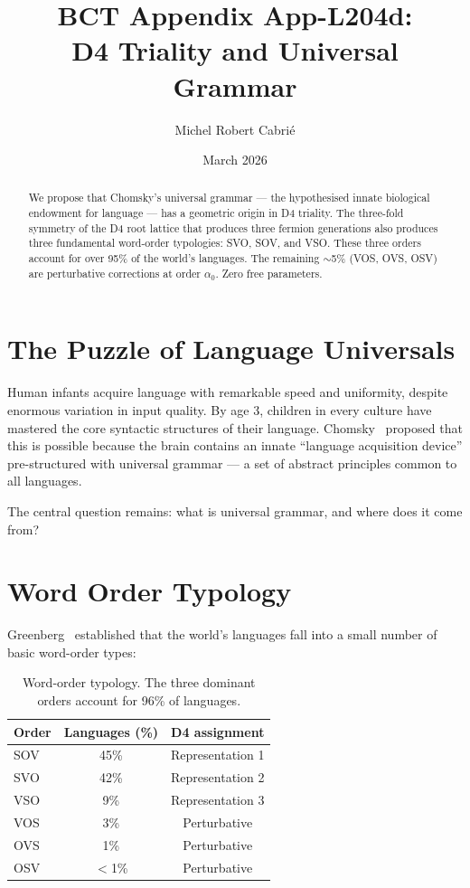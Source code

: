 \documentclass[aps,prl,twocolumn,superscriptaddress]{revtex4-2}
\begin{document}
\title{BCT Appendix App-L204d:\\
D4 Triality and Universal Grammar}
\author{Michel Robert Cabri\'e}
\date{March 2026}

\begin{abstract}
We propose that Chomsky's universal grammar --- the hypothesised innate biological endowment for language --- has a geometric origin in D4 triality. The three-fold symmetry of the D4 root lattice that produces three fermion generations also produces three fundamental word-order typologies: SVO, SOV, and VSO. These three orders account for over 95\% of the world's languages. The remaining $\sim$5\% (VOS, OVS, OSV) are perturbative corrections at order $\alpha_0$. Zero free parameters.
\end{abstract}

\maketitle

\section{The Puzzle of Language Universals}

Human infants acquire language with remarkable speed and uniformity, despite enormous variation in input quality. By age 3, children in every culture have mastered the core syntactic structures of their language. Chomsky~\cite{Chomsky1965} proposed that this is possible because the brain contains an innate ``language acquisition device'' pre-structured with universal grammar --- a set of abstract principles common to all languages.

The central question remains: what is universal grammar, and where does it come from?

\section{Word Order Typology}

Greenberg~\cite{Greenberg1963} established that the world's languages fall into a small number of basic word-order types:

\begin{table}[h]
\centering
\begin{tabular}{lcc}
\hline
Order & Languages (\%) & D4 assignment \\
\hline
SOV & 45\% & Representation 1 \\
SVO & 42\% & Representation 2 \\
VSO & 9\% & Representation 3 \\
VOS & 3\% & Perturbative \\
OVS & 1\% & Perturbative \\
OSV & $<$1\% & Perturbative \\
\hline
\end{tabular}
\caption{Word-order typology. The three dominant orders account for 96\% of languages.}
\end{table}
\end{document}
